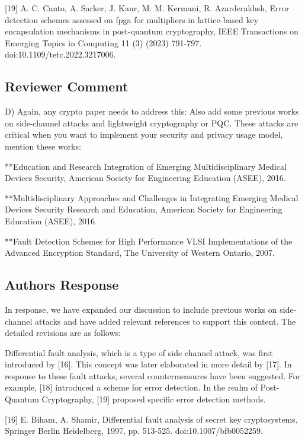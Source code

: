 [19] A. C. Canto, A. Sarker, J. Kaur, M. M. Kermani, R. Azarderakhsh, Error detection schemes assessed on fpga for multipliers in lattice-based key encapsulation mechanisms in post-quantum cryptography, IEEE Transactions on Emerging Topics in Computing 11 (3) (2023) 791-797. doi:10.1109/tetc.2022.3217006.

\color{black}


\subsection{Reviewer Comment}
D) Again, any crypto paper needs to address this: Also add some previous works on side-channel attacks and lightweight cryptography or PQC. These attacks are critical when you want to implement your security and privacy usage model, mention these works:

**Education and Research Integration of Emerging Multidisciplinary Medical Devices Security, American Society for Engineering Education (ASEE), 2016.

**Multidisciplinary Approaches and Challenges in Integrating Emerging Medical Devices Security Research and Education, American Society for Engineering Education (ASEE), 2016.

**Fault Detection Schemes for High Performance VLSI Implementations of the Advanced Encryption Standard, The University of Western Ontario, 2007.



\subsection{Authors Response}

In response, we have expanded our discussion to include previous works on side-channel attacks and have added relevant references to support this content. The detailed revisions are as follows:

\color{blue}

Differential fault analysis, which is a type of side channel attack, was first introduced by [16]. This concept was later elaborated in more detail by [17]. In response to these fault attacks, several countermeasures have been suggested. For example, [18] introduced a scheme for error detection. In the realm of Post-Quantum Cryptography, [19] proposed specific error detection methods.

	[16] E. Biham, A. Shamir, Differential fault analysis of secret key cryptosystems, Springer Berlin Heidelberg, 1997, pp. 513-525. doi:10.1007/bfb0052259.


